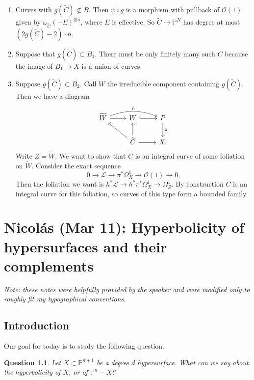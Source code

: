 \documentclass[leqno, openany]{memoir}
\newtheorem{quest}[thm]{Question}
\theoremstyle{definition}
\theoremstyle{remark}
\theoremstyle{plain}
\theoremstyle{definition}
\theoremstyle{remark}
\renewcommand{\P}{\mathbb{P}}
\newcommand{\mc}[1]{\mathcal{#1}}
\newcommand{\wt}[1]{\widetilde{#1}}
\begin{document}
\begin{enumerate}[(1)]
    \item Curves with $g(\wt{C}) \not\subset B$. Then $\psi \circ g$ is a morphism with pullback of $\mc{O}(1)$ given by $\omega_{\wt{C}}(-E)^{\otimes n}$, where $E$ is effective. So $\wt{C} \to \P^N$ has degree at most $(2g(\wt{C})-2) \cdot n$.
    \item Suppose that $g(\wt{C}) \subset B_1$. There must be only finitely many such $C$ because the image of $B_1 \to X$ is a union of curves.
    \item Suppose $g(\wt{C}) \subset B_2$. Call $W$ the irreducible component containing $g(\wt{C})$. Then we have a diagram
        \begin{equation*}
        \begin{tikzcd}
            \wt{W} \ar{r} \ar[bend left=20]{rr}{h} & W \ar[hookrightarrow]{r} & P \ar{d}{\pi} \\
            & \wt{C} \ar{ul} \ar{u} \ar{r} & X.
        \end{tikzcd}
        \end{equation*}
        Write $Z = \wt{W}$. We want to show that $\wt{C}$ is an integral curve of some foliation on $\wt{W}$. Consider the exact sequence
        \[ 0 \to \mc{L} \to \pi^* \Omega^1_X \to \mc{O}(1) \to 0. \]
        Then the foliation we want is $h^* \mc{L} \to h^* \pi^* \Omega^1_X \to \Omega^1_Z$. By construction $\wt{C}$ is an integral curve for this foliation, so curves of this type form a bounded family.
\end{enumerate}

\chapter{Nicol\'as (Mar 11): Hyperbolicity of hypersurfaces and their complements}%

\textit{Note: these notes were helpfully provided by the speaker and were modified only to roughly fit my typographical conventions.}
\section{Introduction}

Our goal for today is to study the following question.

\begin{quest} \label{que:hyperbolicity}
Let $X \subset \P^{n+1}$ be a degree $d$ hypersurface. What can we say about the hyperbolicity of $X$, or of $\P^n-X$?
\end{quest}
\end{document}
